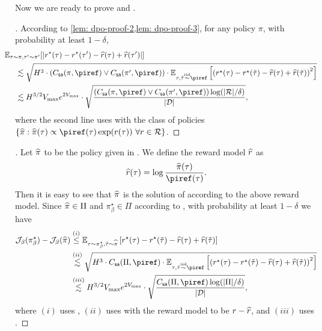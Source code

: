 \documentclass{article}
\begin{document}
Now we are ready to prove  and .
\begin{proof}[]
    According to \cref{lem: dpo-proof-2,lem: dpo-proof-3}, for any policy $\pi$, with probability at least $1 - \delta$,
    \begin{align*}
        &\hspace{-0.5cm} \EE_{\tau\sim \pi, \tau'\sim \pi'}[|r^\star(\tau) - r^\star(\tau') - \hr(\tau) + \hr(\tau')|]\\
        & \lesssim \sqrt{H^3\cdot (\Cs(\pi, \piref)\vee \Cs(\pi', \piref))\cdot \EE_{\tau, \ttau\simiid \piref}\left[\left(r^\star(\tau) - r^\star(\ttau) - \hr(\tau) + \hr(\ttau)\right)^2\right]}\\
        & \lesssim  H^{3/2}\rmax e^{2 \rmax}\cdot \sqrt{\frac{(\Cs(\pi, \piref)\vee \Cs(\pi', \piref))\log(|\calR|/\delta)}{|\calD|}},
    \end{align*}
    where the second line uses  with the class of policies $\{\pihat: \pihat(\tau)\propto \piref(\tau)\exp (r(\tau))\ \forall r\in \calR\}$.
\end{proof}

\begin{proof}[]
    Let $\widehat{\pi}$ to be the policy given in . We define the reward model $\widehat{r}$ as
    $$\hr(\tau) = \log\frac{\pihat(\tau)}{\piref(\tau)}.$$
    Then it is easy to see that $\widehat{\pi}$ is the solution of  according to the above reward model. Since $\widehat{\pi}\in \Pi$ and $\pi_\beta^\star\in \Pi$ according to , with probability at least $1 - \delta$ we have 
    \begin{align*} 
        \Jbeta(\pi_\beta^\star) - \Jbeta(\pihat) & \stackrel{(i)}{\le} \EE_{\tau\sim \pi_\beta^\star, \ttau\sim \pihat}\left[r^\star(\tau) - r^\star(\ttau) - \hr(\tau) + \hr(\ttau)\right]\\
        & \stackrel{(ii)}{\lesssim} \sqrt{H^3\cdot \Cs(\Pi, \piref)\cdot \EE_{\tau, \ttau\simiid \piref}\left[\left(r^\star(\tau) - r^\star(\ttau) - \hr(\tau) + \hr(\ttau)\right)^2\right]}\\
        & \stackrel{(iii)}{\lesssim} H^{3/2}\rmax e^{2 \rmax}\cdot \sqrt{\frac{\Cs(\Pi, \piref)\log(|\Pi|/\delta)}{|\calD|}},
    \end{align*}
    where $(i)$ uses , $(ii)$ uses  with the reward model to be $r - \widehat{r}$, and $(iii)$ uses .
\end{proof}
\end{document}
